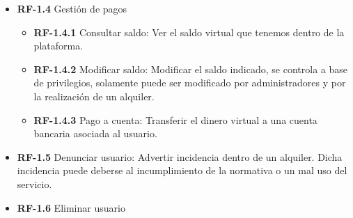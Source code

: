 \documentclass[11pt,spanish]{article} %
\begin{document}
\begin{itemize}
\begin{itemize}
		\item \textbf{RF-1.4} Gestión de pagos
		\begin{itemize}
			\item \textbf{RF-1.4.1} Consultar saldo: Ver el saldo virtual que tenemos dentro de la plataforma.
			\item \textbf{RF-1.4.2} Modificar saldo: Modificar el saldo indicado, se controla a base de privilegios, solamente puede ser modificado por administradores y por la realización de un alquiler.
			\item \textbf{RF-1.4.3} Pago a cuenta: Transferir el dinero virtual a una cuenta bancaria asociada al usuario.
		\end{itemize}
		\item \textbf{RF-1.5} Denunciar usuario: Advertir incidencia dentro de un alquiler. Dicha incidencia puede deberse al incumplimiento de la normativa o un mal uso del servicio.
		\item \textbf{RF-1.6} Eliminar usuario
	\end{itemize}


\end{itemize}
\end{document}
